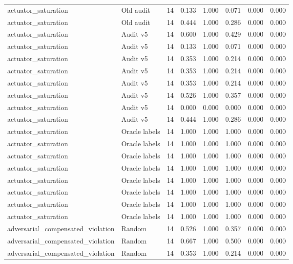 {\begin{longtable}{llrrrrrr}
actuator\_saturation & Old audit & 14 & 0.133 & 1.000 & 0.071 & 0.000 & 0.000 \\
actuator\_saturation & Old audit & 14 & 0.444 & 1.000 & 0.286 & 0.000 & 0.000 \\
actuator\_saturation & Audit v5 & 14 & 0.600 & 1.000 & 0.429 & 0.000 & 0.000 \\
actuator\_saturation & Audit v5 & 14 & 0.133 & 1.000 & 0.071 & 0.000 & 0.000 \\
actuator\_saturation & Audit v5 & 14 & 0.353 & 1.000 & 0.214 & 0.000 & 0.000 \\
actuator\_saturation & Audit v5 & 14 & 0.353 & 1.000 & 0.214 & 0.000 & 0.000 \\
actuator\_saturation & Audit v5 & 14 & 0.353 & 1.000 & 0.214 & 0.000 & 0.000 \\
actuator\_saturation & Audit v5 & 14 & 0.526 & 1.000 & 0.357 & 0.000 & 0.000 \\
actuator\_saturation & Audit v5 & 14 & 0.000 & 0.000 & 0.000 & 0.000 & 0.000 \\
actuator\_saturation & Audit v5 & 14 & 0.444 & 1.000 & 0.286 & 0.000 & 0.000 \\
actuator\_saturation & Oracle labels & 14 & 1.000 & 1.000 & 1.000 & 0.000 & 0.000 \\
actuator\_saturation & Oracle labels & 14 & 1.000 & 1.000 & 1.000 & 0.000 & 0.000 \\
actuator\_saturation & Oracle labels & 14 & 1.000 & 1.000 & 1.000 & 0.000 & 0.000 \\
actuator\_saturation & Oracle labels & 14 & 1.000 & 1.000 & 1.000 & 0.000 & 0.000 \\
actuator\_saturation & Oracle labels & 14 & 1.000 & 1.000 & 1.000 & 0.000 & 0.000 \\
actuator\_saturation & Oracle labels & 14 & 1.000 & 1.000 & 1.000 & 0.000 & 0.000 \\
actuator\_saturation & Oracle labels & 14 & 1.000 & 1.000 & 1.000 & 0.000 & 0.000 \\
actuator\_saturation & Oracle labels & 14 & 1.000 & 1.000 & 1.000 & 0.000 & 0.000 \\
adversarial\_compensated\_violation & Random & 14 & 0.526 & 1.000 & 0.357 & 0.000 & 0.000 \\
adversarial\_compensated\_violation & Random & 14 & 0.667 & 1.000 & 0.500 & 0.000 & 0.000 \\
adversarial\_compensated\_violation & Random & 14 & 0.353 & 1.000 & 0.214 & 0.000 & 0.000 \\

\end{longtable}}
